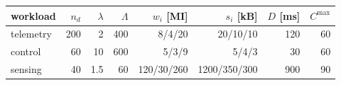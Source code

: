 \scriptsize
\begin{tabular}{lrrrrrrr}
\toprule
workload & $n_d$ & $\lambda$ & $\Lambda$ & $w_i$ [MI] & $s_i$ [kB] & $D$ [ms] & $C^{\max}$ \\
\midrule
telemetry & 200 & 2 & 400 & 8/4/20 & 20/10/10 & 120 & 60 \\
control & 60 & 10 & 600 & 5/3/9 & 5/4/3 & 30 & 60 \\
sensing & 40 & 1.5 & 60 & 120/30/260 & 1200/350/300 & 900 & 90 \\
\bottomrule
\end{tabular}
